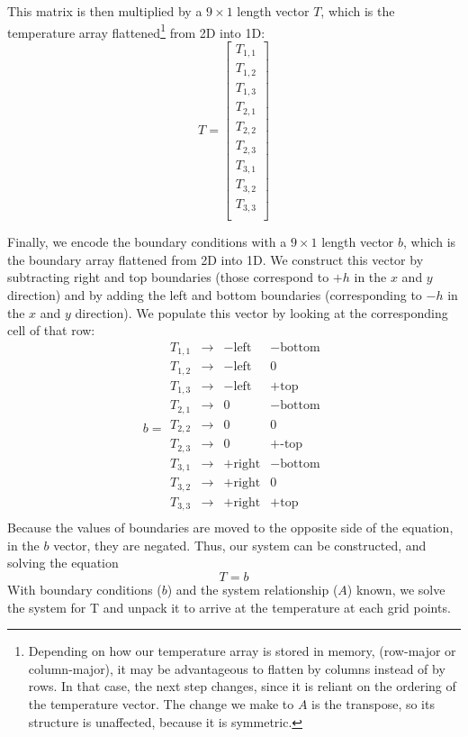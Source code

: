 \documentclass[10pt,letterpaper,notitlepage]{article}
\begin{document}
	This matrix is then multiplied by a $9\times1$ length vector $T$, which is the temperature array flattened\footnote{Depending on how our temperature array is stored in memory, (row-major or column-major), it may be advantageous to flatten by columns instead of by rows. In that case, the next step changes, since it is reliant on the ordering of the temperature vector. The change we make to $A$ is the transpose, so its structure is unaffected, because it is symmetric.} from 2D into 1D:
	\begin{equation}
		T = \begin{bmatrix}
			T_{1,1} \\
			T_{1,2} \\
			T_{1,3} \\
			T_{2,1} \\
			T_{2,2} \\
			T_{2,3} \\
			T_{3,1} \\
			T_{3,2} \\
			T_{3,3} \\
		\end{bmatrix}
	\end{equation}
	
	Finally, we encode the boundary conditions with a $9\times1$ length vector $b$, which is the boundary array flattened from 2D into 1D. We construct this vector by subtracting right and top boundaries (those correspond to $+h$ in the $x$ and $y$ direction) and by adding the left and bottom boundaries (corresponding to $-h$ in the $x$ and $y$ direction). We populate this vector by looking at the corresponding cell of that row:
	\begin{equation}
		b = \begin{matrix}
			T_{1,1} & \rightarrow &-\text{left}  & -\text{bottom} \\
			T_{1,2} & \rightarrow &-\text{left}  & 0 \\
			T_{1,3} & \rightarrow &-\text{left}  & +\text{top} \\
			T_{2,1} & \rightarrow & 0 & -\text{bottom} \\
			T_{2,2} & \rightarrow & 0 & 0 \\
			T_{2,3} & \rightarrow & 0 & +\text{-top} \\
			T_{3,1} & \rightarrow &+\text{right} & -\text{bottom} \\
			T_{3,2} & \rightarrow &+\text{right} & 0 \\
			T_{3,3} & \rightarrow &+\text{right} & +\text{top} \\
		\end{matrix}
	\end{equation}
	Because the values of boundaries are moved to the opposite side of the equation, in the $b$ vector, they are negated.
	Thus, our system can be constructed, and solving the equation
	\begin{equation}
		[A] {T} = {b}
	\end{equation}
	With boundary conditions ($b$) and the system relationship ($A$) known, we solve the system for T and unpack it to arrive at the temperature at each grid points.
\end{document}
